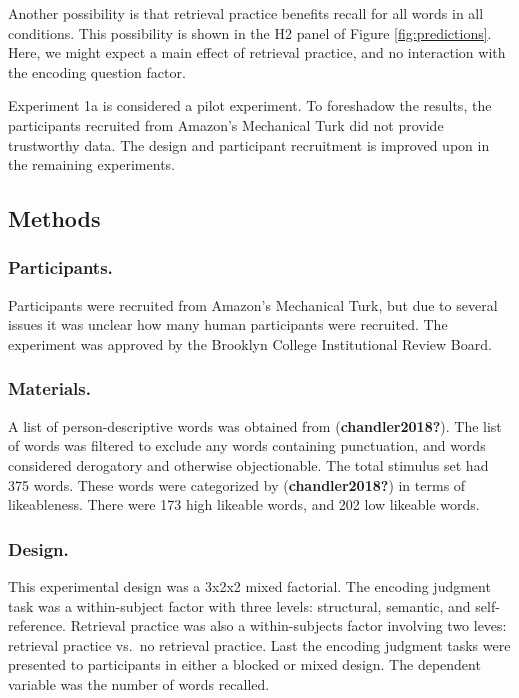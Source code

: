 \documentclass[
  man,floatsintext]{apa6}
\begin{document}
Another possibility is that retrieval practice benefits recall for all words in all conditions. This possibility is shown in the H2 panel of Figure \ref{fig:predictions}. Here, we might expect a main effect of retrieval practice, and no interaction with the encoding question factor.

Experiment 1a is considered a pilot experiment. To foreshadow the results, the participants recruited from Amazon's Mechanical Turk did not provide trustworthy data. The design and participant recruitment is improved upon in the remaining experiments.

\hypertarget{methods}{%
\subsection{Methods}\label{methods}}

\hypertarget{participants.}{%
\subsubsection{Participants.}\label{participants.}}

Participants were recruited from Amazon's Mechanical Turk, but due to several issues it was unclear how many human participants were recruited. The experiment was approved by the Brooklyn College Institutional Review Board.

\hypertarget{materials.}{%
\subsubsection{Materials.}\label{materials.}}

A list of person-descriptive words was obtained from (\textbf{chandler2018?}). The list of words was filtered to exclude any words containing punctuation, and words considered derogatory and otherwise objectionable. The total stimulus set had 375 words. These words were categorized by (\textbf{chandler2018?}) in terms of likeableness. There were 173 high likeable words, and 202 low likeable words.

\hypertarget{design.}{%
\subsubsection{Design.}\label{design.}}

This experimental design was a 3x2x2 mixed factorial. The encoding judgment task was a within-subject factor with three levels: structural, semantic, and self-reference. Retrieval practice was also a within-subjects factor involving two leves: retrieval practice vs.~no retrieval practice. Last the encoding judgment tasks were presented to participants in either a blocked or mixed design. The dependent variable was the number of words recalled.
\end{document}
